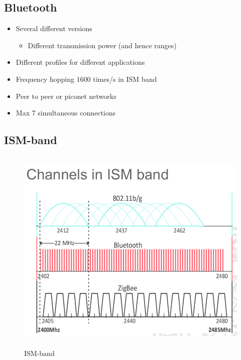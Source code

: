 \subsection{Bluetooth}
 \begin{itemize}
\item Several different versions
  \begin{itemize}
    \item Different transmission power (and hence ranges)
  \end{itemize}
\item Different profiles for different applications
\item Frequency hopping 1600 times/s in ISM band
\item Peer to peer or piconet networks
\item Max 7 simultaneous connections
\end{itemize}

\subsection{ISM-band}
\begin{figure}[h]
    \vspace{10mm}
    \centering
    \includegraphics[width=12cm, height=10cm]{image/ISM-band.png}
    \caption{ISM-band}
\end{figure}

